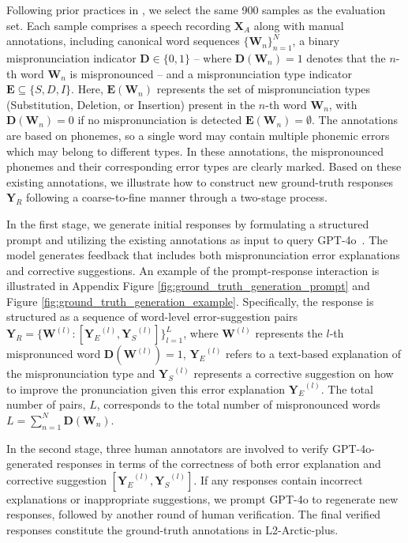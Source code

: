 \documentclass[11pt]{article}
\begin{document}
Following prior practices in \citet{peng2021study, 9052975, yang2022improving}, we select the same 900 samples as the evaluation set. Each sample comprises a speech recording $\boldsymbol{X}_A$ along with manual annotations, including canonical word sequences $\{\boldsymbol{W}_n\}^N_{n=1}$, a binary mispronunciation indicator $\boldsymbol{D} \in \{0,1\}$ -- where $\boldsymbol{D}(\boldsymbol{W}_n)=1$ denotes that the $n$-th word $\boldsymbol{W}_n$ is mispronounced -- and a mispronunciation type indicator $\boldsymbol{E} \subseteq \{S, D, I\}$. Here, $\boldsymbol{E}(\boldsymbol{W}_n)$ represents the set of mispronunciation types (Substitution, Deletion, or Insertion) present in the $n$-th word $\boldsymbol{W}_n$, with $\boldsymbol{D}(\boldsymbol{W}_n) = 0$ if no mispronunciation is detected $\boldsymbol{E}(\boldsymbol{W}_n) = \emptyset$. The annotations are based on phonemes, so a single word may contain multiple phonemic errors which may belong to different types. In these annotations, the mispronounced phonemes and their corresponding error types are clearly marked. Based on these existing annotations, we illustrate how to construct new ground-truth responses $\boldsymbol{Y}_R$ following a coarse-to-fine manner through a two-stage process. 

In the first stage, we generate initial responses by formulating a structured prompt and utilizing the existing annotations as input to query GPT-4o~\cite{gpt-4o}. The model generates feedback that includes both mispronunciation error explanations and corrective suggestions. An example of the prompt-response interaction is illustrated in Appendix Figure \ref{fig:ground_truth_generation_prompt} and Figure \ref{fig:ground_truth_generation_example}. Specifically, the response is structured as a sequence of word-level error-suggestion pairs $\boldsymbol{Y}_R = \{\boldsymbol{W}^{(l)}\colon[{\boldsymbol{Y}_E}^{(l)}, {\boldsymbol{Y}_S}^{(l)}]\}^L_{l=1}$, where $\boldsymbol{W}^{(l)}$ represents the $l$-th mispronunced word $\boldsymbol{D}(\boldsymbol{W}^{(l)})=1$, ${\boldsymbol{Y}_E}^{(l)}$ refers to a text-based explanation of the mispronunciation type and ${\boldsymbol{Y}_S}^{(l)}$ represents a corrective suggestion on how to improve the pronunciation given this error explanation ${\boldsymbol{Y}_E}^{(l)}$. The total number of pairs, $L$, corresponds to the total number of mispronounced words $L=\sum_{n=1}^N\boldsymbol{D}(\boldsymbol{W}_n)$. 

In the second stage, three human annotators are involved to verify GPT-4o-generated responses in terms of the correctness of both error explanation and corrective suggestion $[{\boldsymbol{Y}_E}^{(l)}, {\boldsymbol{Y}_S}^{(l)}]$. If any responses contain incorrect explanations or inappropriate suggestions, we prompt GPT-4o to regenerate new responses, followed by another round of human verification. The final verified responses constitute the ground-truth annotations in L2-Arctic-plus. 
\end{document}
